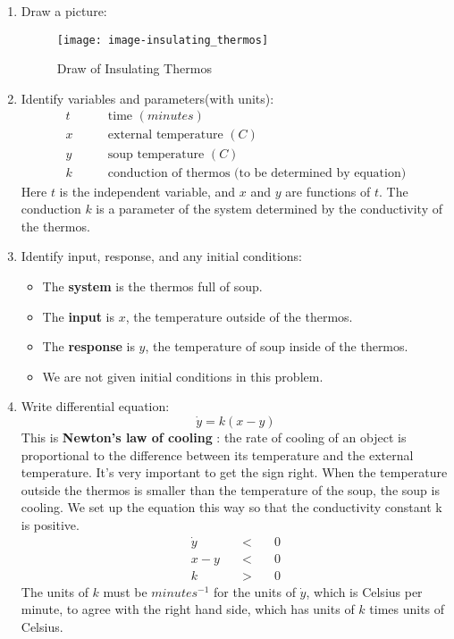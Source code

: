 \begin{enumerate}
\item {\color{blue} Draw a picture:}
  \begin{figure}[ht!]
    \centering
    \texttt{[image: image-insulating\_thermos]}
    \caption{Draw of Insulating Thermos}
  \end{figure}
\item {\color{blue} Identify variables and parameters(with units):}
  \begin{align*}
    t \qquad &\text{time }(minutes)\\
    x \qquad &\text{external temperature } (C)\\
    y \qquad &\text{soup temperature } (C)\\
    k \qquad &\text{conduction of thermos (to be determined by equation)}
  \end{align*}
  Here $t$ is the independent variable, and $x$ and $y$ are functions of $t$.
  The conduction $k$ is a parameter of the system determined by the conductivity of the thermos.
\item {\color{blue} Identify input, response, and any initial conditions:}
  \begin{itemize}
  \item The \textbf{system} is the thermos full of soup.
  \item The \textbf{\color{blue} input} is $x$, the temperature outside of the thermos.
  \item The \textbf{\color{orange} response} is $y$, the temperature of soup inside of the thermos.
  \item We are not given initial conditions in this problem.
  \end{itemize}
\item {\color{blue} Write differential equation:}
  \begin{equation*}
    \dot y = k(x -y)
  \end{equation*}
  This is \textbf{\color{orange}Newton's law of cooling} : the rate of cooling of an object
  is proportional to the difference between its temperature and the external temperature.
  It's very important to get the sign right.
  When the temperature outside the thermos is smaller than the temperature of the soup,
  the soup is cooling.
  We set up the equation this way so that the conductivity constant k is positive.
  \begin{eqnarray*}
    \dot y \quad &<& \quad 0  \\
    x - y \quad &<& \quad 0  \\
    k \quad &>& \quad 0 
  \end{eqnarray*}
  The units of $k$ must be $minutes^{-1}$ for the units of $\dot y$,
  which is Celsius per minute, to agree with the right hand side,
  which has units of $k$ times units of Celsius.\\


\end{enumerate}
